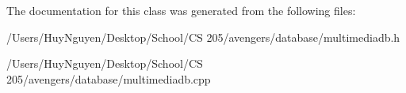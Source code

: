 The documentation for this class was generated from the following files\+:\begin{DoxyCompactItemize}
\item 
/\+Users/\+Huy\+Nguyen/\+Desktop/\+School/\+C\+S 205/avengers/database/multimediadb.\+h\item 
/\+Users/\+Huy\+Nguyen/\+Desktop/\+School/\+C\+S 205/avengers/database/multimediadb.\+cpp\end{DoxyCompactItemize}
